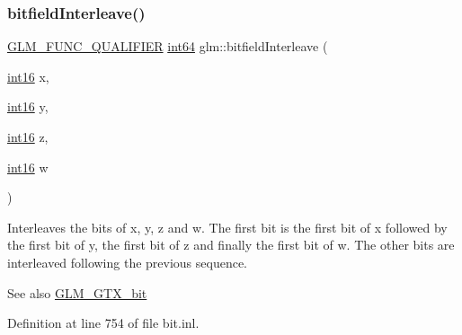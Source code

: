 \subsubsection{\texorpdfstring{bitfield\+Interleave()}{bitfieldInterleave()}\hspace{0.1cm}{\footnotesize\ttfamily [15/16]}}
{\footnotesize\ttfamily \hyperlink{setup_8hpp_a33fdea6f91c5f834105f7415e2a64407}{G\+L\+M\+\_\+\+F\+U\+N\+C\+\_\+\+Q\+U\+A\+L\+I\+F\+I\+ER} \hyperlink{group__gtc__type__precision_ga435d75819cce297cc5fa21bd84ef89a5}{int64} glm\+::bitfield\+Interleave (\begin{DoxyParamCaption}\item[{\hyperlink{group__gtc__type__precision_ga2945a61d12771f8954994fcddf02b021}{int16}}]{x,  }\item[{\hyperlink{group__gtc__type__precision_ga2945a61d12771f8954994fcddf02b021}{int16}}]{y,  }\item[{\hyperlink{group__gtc__type__precision_ga2945a61d12771f8954994fcddf02b021}{int16}}]{z,  }\item[{\hyperlink{group__gtc__type__precision_ga2945a61d12771f8954994fcddf02b021}{int16}}]{w }\end{DoxyParamCaption})}

Interleaves the bits of x, y, z and w. The first bit is the first bit of x followed by the first bit of y, the first bit of z and finally the first bit of w. The other bits are interleaved following the previous sequence.

\begin{DoxySeeAlso}{See also}
\hyperlink{group__gtx__bit}{G\+L\+M\+\_\+\+G\+T\+X\+\_\+bit} 
\end{DoxySeeAlso}


Definition at line 754 of file bit.\+inl.

\mbox{\label{group__gtx__bit_gac8a926a7bfd9b23c22a4f685193fbfe1}} 

